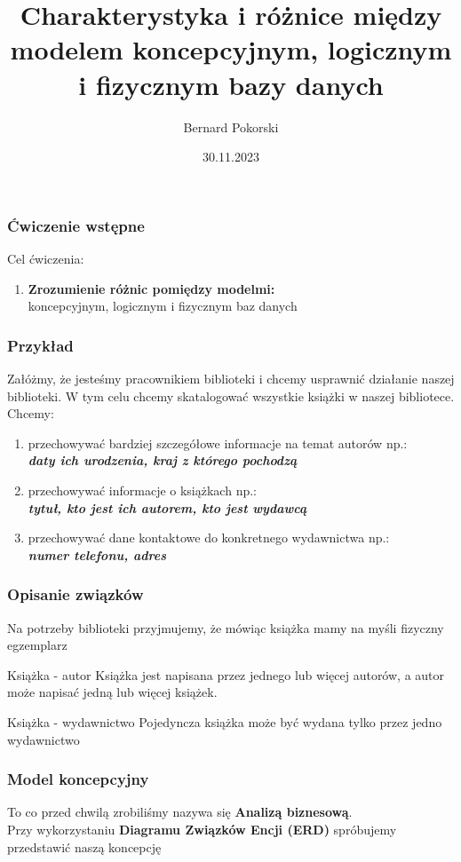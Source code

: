 \documentclass{beamer}
\title{Charakterystyka i różnice między modelem koncepcyjnym, logicznym i fizycznym bazy danych}
\author{Bernard Pokorski}
\date{30.11.2023}
\begin{document}
\begin{frame}
\titlepage %
\end{frame}

\begin{frame}
\frametitle{Ćwiczenie wstępne}
Cel ćwiczenia:
\begin{enumerate}
    \item \textbf{Zrozumienie różnic pomiędzy modelmi:} \\ koncepcyjnym, logicznym i fizycznym baz danych
\end{enumerate}
\end{frame}

\begin{frame}
    \frametitle{Przykład}
    Załóżmy, że jesteśmy pracownikiem biblioteki i chcemy usprawnić działanie naszej biblioteki.
    W tym celu chcemy skatalogować wszystkie książki w naszej bibliotece.
    Chcemy: 
    \begin{enumerate}
    \item przechowywać bardziej szczegółowe informacje na temat autorów np.: \\ \textbf{\textit{daty ich urodzenia, kraj z którego pochodzą}}
    \item przechowywać informacje o książkach np.:\\ \textbf{\textit{tytuł, kto jest ich autorem, kto jest wydawcą}}
    \item przechowywać dane kontaktowe do konkretnego wydawnictwa np.:\\ \textbf{\textit{numer telefonu, adres}}
\end{enumerate}
\end{frame}

\begin{frame}
    \frametitle{Opisanie związków}
    Na potrzeby biblioteki przyjmujemy, że mówiąc książka mamy na myśli fizyczny egzemplarz
    \begin{block}{Książka - autor}
        Książka jest napisana przez jednego lub więcej autorów, a autor może napisać jedną lub więcej książek.
    \end{block}
    \begin{block}{Książka - wydawnictwo}
        Pojedyncza książka może być wydana tylko przez jedno wydawnictwo 
    \end{block}
\end{frame}

\begin{frame}
    \frametitle{Model koncepcyjny}
   To co przed chwilą zrobiliśmy nazywa się \textbf{Analizą biznesową}. \\
   Przy wykorzystaniu \textbf{Diagramu Związków Encji (ERD)} spróbujemy przedstawić naszą koncepcję 
\end{frame}
\end{document}

